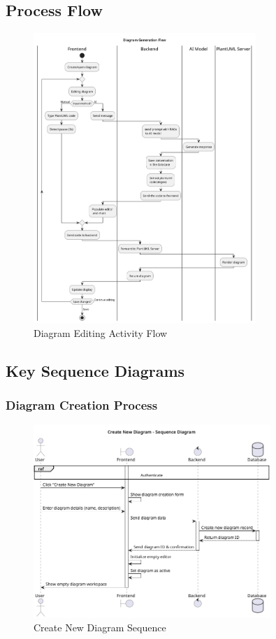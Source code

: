 \subsection{Process Flow}
\begin{figure}[H]
\centering
\includegraphics[width=0.75\textwidth]{conception/SprintIV/Activity_diagrams/edit_diagams.png}
\caption{Diagram Editing Activity Flow}
\end{figure}

\subsection{Key Sequence Diagrams}

\subsubsection{Diagram Creation Process}
\begin{figure}[H]
\centering
\includegraphics[width=0.8\textwidth]{conception/SprintIV/sequence_diagrams/sequence_diagramManagement_4_1_CreateNewDiagram.png}
\caption{Create New Diagram Sequence}
\end{figure}

